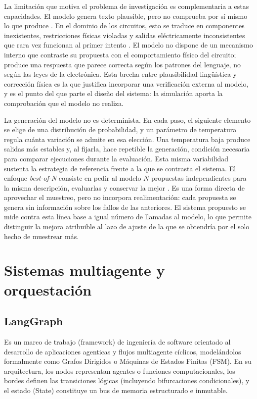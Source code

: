 La limitación que motiva el problema de investigación es complementaria a estas capacidades. El modelo genera texto plausible, pero no comprueba por sí mismo lo que produce \cite{ji2023survey}. En el dominio de los circuitos, esto se traduce en componentes inexistentes, restricciones físicas violadas y salidas eléctricamente inconsistentes que rara vez funcionan al primer intento \cite{analogcoder,analogagent}. El modelo no dispone de un mecanismo interno que contraste su propuesta con el comportamiento físico del circuito; produce una respuesta que parece correcta según los patrones del lenguaje, no según las leyes de la electrónica. Esta brecha entre plausibilidad lingüística y corrección física es la que justifica incorporar una verificación externa al modelo, y es el punto del que parte el diseño del sistema: la simulación aporta la comprobación que el modelo no realiza.

La generación del modelo no es determinista. En cada paso, el siguiente elemento se elige de una distribución de probabilidad, y un parámetro de temperatura regula cuánta variación se admite en esa elección. Una temperatura baja produce salidas más estables y, al fijarla, hace repetible la generación, condición necesaria para comparar ejecuciones durante la evaluación. Esta misma variabilidad sustenta la estrategia de referencia frente a la que se contrasta el sistema. El enfoque \textit{best-of-N} consiste en pedir al modelo $N$ propuestas independientes para la misma descripción, evaluarlas y conservar la mejor \cite{chen2021evaluating}. Es una forma directa de aprovechar el muestreo, pero no incorpora realimentación: cada propuesta se genera sin información sobre los fallos de las anteriores. El sistema propuesto se mide contra esta línea base a igual número de llamadas al modelo, lo que permite distinguir la mejora atribuible al lazo de ajuste de la que se obtendría por el solo hecho de muestrear más.


\section{Sistemas multiagente y orquestación}

\subsection{LangGraph}

Es un marco de trabajo (framework) de ingeniería de software orientado al desarrollo de aplicaciones agenticas y flujos multiagente cíclicos, modelándolos formalmente como Grafos Dirigidos o Máquinas de Estados Finitas (FSM). En su arquitectura, los nodos representan agentes o funciones computacionales, los bordes definen las transiciones lógicas (incluyendo bifurcaciones condicionales), y el estado (State) constituye un bus de memoria estructurado e inmutable.

